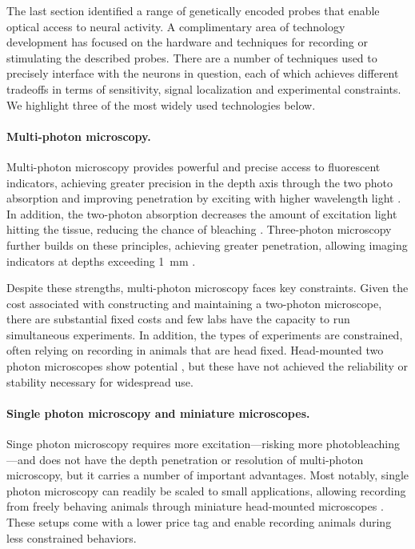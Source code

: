 The last section identified 
a range of genetically encoded probes that enable optical 
access to neural activity. A complimentary area of 
technology development has focused on the hardware and 
techniques for recording or stimulating the described 
probes. There are a number of techniques used to precisely 
interface with the neurons in question, each of which 
achieves different tradeoffs in terms of sensitivity, 
signal localization and experimental constraints. We 
highlight three of the most widely used technologies 
below.

\paragraph{Multi-photon microscopy.} Multi-photon microscopy
provides powerful and precise access to fluorescent indicators,
achieving greater precision in the depth axis through the 
two photo absorption and improving penetration by exciting  
with higher wavelength light \cite{Xu:1996ul}. In addition,
the two-photon absorption decreases the amount of excitation light 
hitting the tissue, reducing the chance of bleaching \cite{Denk:1990ws}.
Three-photon microscopy further builds on these principles, 
achieving greater penetration, allowing imaging indicators 
at depths exceeding 1~mm \cite{Horton:2013gxa,Wang:2017jp}.

Despite these strengths, multi-photon microscopy faces key 
constraints. Given the cost associated with constructing and 
maintaining a two-photon microscope, there are substantial fixed 
costs and few labs have the capacity to run simultaneous 
experiments. In addition, the types of experiments are constrained,
often relying on recording in animals that are head fixed. 
Head-mounted two photon microscopes show 
potential \cite{Helmchen:2001tw,Flusberg:2005tq}, but these 
have not achieved the reliability or stability necessary for 
widespread use.

\paragraph{Single photon microscopy and miniature microscopes.}
Singe photon microscopy requires more excitation---risking more
photobleaching---and does not have the depth penetration or 
resolution of multi-photon microscopy, but it carries a number 
of important advantages. Most notably, single photon microscopy 
can readily be scaled to small applications, allowing recording 
from freely behaving animals through miniature head-mounted 
microscopes \cite{Ghosh:2011ee,Cai:2016hm,LibertiIII:2017df}.
These setups come with a lower price tag and enable 
recording animals during less constrained behaviors.

